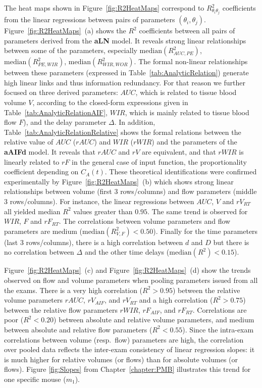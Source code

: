 The heat maps shown in Figure~\ref{fig:R2HeatMaps} correspond to $R^2_{\theta_{i}\theta_{j}}$ coefficients from the linear regressions between pairs of parameters $\left(\theta_{i}, \theta_{j}\right)$. Figure~\ref{fig:R2HeatMaps}~(a) shows the $R^2$ coefficients between all pairs of parameters derived from the \textbf{aLN} model. It reveals strong linear relationships between some of the parameters, especially $\mathrm{median}\left(R^2_{AUC, PE}\right)$, $\mathrm{median}\left(R^2_{PE, WIR}\right)$, $\mathrm{median}\left(R^2_{WIR, WOR}\right)$. The formal non-linear relationships between these parameters (expressed in Table~\ref{tab:AnalyticRelation}) generate high linear links and thus information redundancy. For that reason we further focused on three derived parameters: $AUC$, which is related to tissue blood volume $V$, according to the closed-form expressions given in Table~\ref{tab:AnalyticRelationAIF}, $WIR$, which is mainly related to tissue blood flow $F$), and the delay parameter $\Delta$. In addition, Table~\ref{tab:AnalyticRelationRelative} shows the formal relations between the relative value of $AUC$ ($rAUC$) and $WIR$ ($rWIR$) and the parameters of the \textbf{aAIFd} model. It reveals that $rAUC$ and $rV$ are equivalent, and that $rWIR$ is linearly related to $rF$ in the general case of input function, the proportionality coefficient depending on $C_A\left(t\right)$. These theoretical identifications were confirmed experimentally by Figure~\ref{fig:R2HeatMaps}~(b) which shows strong linear relationships between volume (first 3 rows/columns) and flow parameters (middle 3 rows/columns). For instance, the linear regressions between $AUC$, $V$ and $rV_{RT}$ all yielded median $R^2$ values greater than $0.95$. The same trend is observed for $WIR$, $F$ and $rF_{RT}$. The correlations between volume parameters and flow parameters are medium ($\mathrm{median}\left(R^2_{V, F}\right) < 0.50$). Finally for the time parameters (last 3 rows/columns), there is a high correlation between $d$ and $D$ but there is no correlation between $\Delta$ and the other time delays ($\mathrm{median}\left(R^2\right) < 0.15$). 

Figure~\ref{fig:R2HeatMaps}~(c) and Figure~\ref{fig:R2HeatMaps}~(d) show the trends observed on flow and volume parameters when pooling parameters issued from all the exams. 
There is a very high correlation ($R^2 > 0.95$) between the relative volume parameters $rAUC$, $rV_{AIF}$, and $rV_{RT}$ and a high correlation ($R^2 > 0.75$) between the relative flow parameters $rWIR$, $rF_{AIF}$, and $rF_{RT}$. Correlations are poor ($R^2 < 0.20$) between absolute and relative volume parameters, and medium between absolute and relative flow parameters ($R^2< 0.55$). Since the intra-exam correlations between volume (resp.~flow) parameters are high, the correlation over pooled data reflects the inter-exam consistency of linear regression slopes: it is much higher for relative volumes (or flows) than for absolute volumes (or flows). Figure \ref{fig:Slopes} from Chapter~\ref{chapter:PMB} illustrates this trend for one specific mouse ($m_1$). 
\FloatBarrier


